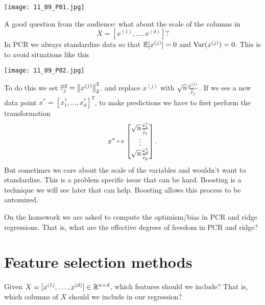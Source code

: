 \begin{center}
    \texttt{[image: 11\_09\_P01.jpg]}
\end{center}

\begin{remark}
    A good question from the audience: what about the scale of the columns in 
    \[X = [x^{(1)},\ldots, x^{(d)}]?\] 
    In  PCR we always standardize data so that ${\mathbb{E}}[x^{(j)}]=0$ and $\operatorname{Var}(x^{(j)})=0$. This is to avoid situations like this 

    \begin{center}
        \texttt{[image: 11\_09\_P02.jpg]}   
    \end{center}

    To do this we set $\widehat{\tau}_j^2 = \left\|x^{(j)}\right\|_2^2$. and replace $x^{(j)}$ with $\sqrt{n} \frac{x^{(j)}}{\widehat{\tau}_j}$. If we see a new data point $x^*=[x_1^*,\ldots, x_d^*]^T$, to make predictions we have to first perform the transformation
    \[x^* \mapsto \begin{bmatrix}
        \sqrt{n} \frac{x_1^*}{\widehat{\tau}_1}\\ \vdots \\ \sqrt{n} \frac{x_d^*}{\widehat{\tau}_d}
    \end{bmatrix}.\]
    But sometimes we care about the scale of the variables and wouldn't want to standardize. This is a problem specific issue that can be hard. Boosting is a technique we will see later that can help. Boosting allows this process to be automized.
\end{remark}
\begin{remark}
    On the homework we are asked to compute the optimism/bias in PCR and ridge regressions. That is, what are the effective degrees of freedom in PCR and ridge?
\end{remark}
\section{Feature selection methods}
Given $X = [x^{(1)},\ldots, x^{(d)}] \in {\mathbb R}^{n \times d}$, which features should we include? That is, which columns of $X$ should we include in our regression?

